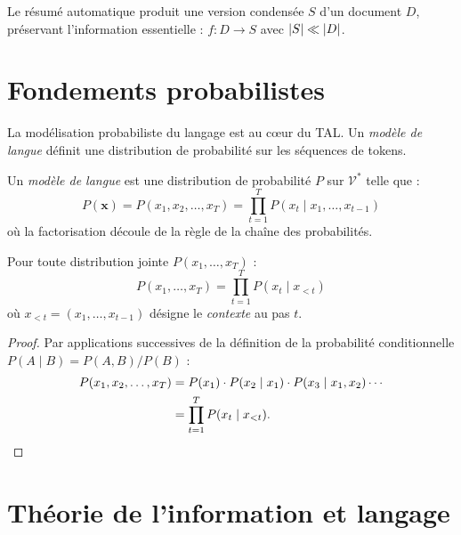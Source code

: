 Le r\'esum\'e automatique produit une version condens\'ee $S$ d'un document $D$,
pr\'eservant l'information essentielle : $f : D \to S$ avec $\left| S \right| \ll \left| D \right|$.

\section{Fondements probabilistes}
\label{sec:intro:proba}

La mod\'elisation probabiliste du langage est au c\oe ur du TAL. Un
\emph{mod\`ele de langue} d\'efinit une distribution de probabilit\'e sur les
s\'equences de tokens.

\begin{definition}
Un \emph{mod\`ele de langue} est une distribution de probabilit\'e $P$ sur
$\mathcal{V}^*$ telle que :
\[
P(\mathbf{x}) = P(x_1, x_2, \ldots, x_T) = \prod_{t=1}^{T} P(x_t \mid x_1, \ldots, x_{t-1})
\]
o\`u la factorisation d\'ecoule de la r\`egle de la cha\^ine des probabilit\'es.
\end{definition}

\begin{theoreme}
Pour toute distribution jointe $P(x_1, \ldots, x_T)$ :
\[
P(x_1, \ldots, x_T) = \prod_{t=1}^{T} P(x_t \mid x_{<t})
\]
o\`u $x_{<t} = (x_1, \ldots, x_{t-1})$ d\'esigne le \emph{contexte} au pas $t$.
\end{theoreme}

\begin{proof}
Par applications successives de la d\'efinition de la probabilit\'e conditionnelle
$P(A \mid B) = P(A, B) / P(B)$ :
\begin{align*}
P(x_1, x_2, \ldots, x_T) &= P(x_1) \cdot P(x_2 \mid x_1) \cdot P(x_3 \mid x_1, x_2) \cdots \\
                           &= \prod_{t=1}^{T} P(x_t \mid x_{<t}). \qedhere
\end{align*}
\end{proof}

\section{Th\'eorie de l'information et langage}
\label{sec:intro:info}


